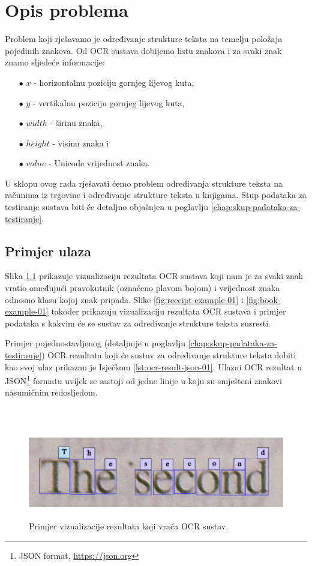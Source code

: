 \documentclass[times, utf8, zavrsni]{fer}
\begin{document}
\chapter{Opis problema}
Problem koji rješavamo je određivanje strukture teksta na temelju položaja pojedinih znakova.
Od OCR sustava dobijemo listu znakova i za svaki znak znamo sljedeće informacije:
\begin{itemize}
    \item[$\bullet$] $x$ - horizontalnu poziciju gornjeg lijevog kuta,
    \item[$\bullet$] $y$ - vertikalnu poziciju gornjeg lijevog kuta,
    \item[$\bullet$] $width$ - širinu znaka,
    \item[$\bullet$] $height$ - visinu znaka i
    \item[$\bullet$] $value$ - Unicode vrijednost znaka.
\end{itemize}

U sklopu ovog rada rješavati ćemo problem određivanja strukture teksta
na računima iz trgovine i određivanje strukture teksta u knjigama. Stup podataka za testiranje
sustava biti će detaljno objašnjen u poglavlju \ref{chap:skup-padataka-za-testiranje}.

\section{Primjer ulaza}

Slika \ref{fig:book-example-02} prikazuje vizualizaciju rezultata OCR sustava koji nam je za svaki
znak vratio omeđujući pravokutnik (označeno plavom bojom) i vrijednost znaka odnosno klasu kojoj
znak pripada. Slike \ref{fig:receipt-example-01} i \ref{fig:book-example-01} također prikazuju
vizualizaciju rezultata OCR sustava i primjer podataka s kakvim će se sustav za
određivanje strukture teksta susresti.

Primjer pojednostavljenog (detaljnije u poglavlju \ref{chap:skup-padataka-za-testiranje}) OCR rezultata koji će sustav za određivanje strukture teksta dobiti kao svoj
ulaz prikazan je Isječkom \ref{lst:ocr-result-json-01}. Ulazni OCR rezultat u JSON\footnote{JSON format, \url{https://json.org}}
formatu uvijek se sastoji od jedne linije u koju su smješteni znakovi nasumičnim redosljedom.

\

\begin{figure}[htb]
    \centering
    \includegraphics[height=4cm]{images/book-example-02.png}
    \caption{Primjer vizualizacije rezultata koji vraća OCR sustav.}
    \label{fig:book-example-02}
\end{figure}
\end{document}
